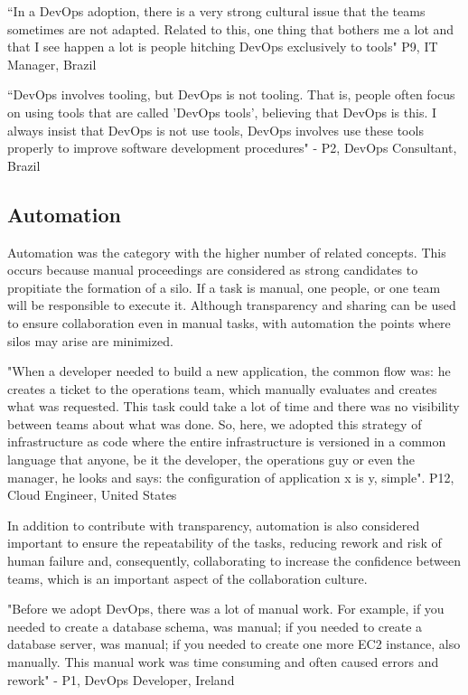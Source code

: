 ``In a DevOps adoption, there is a very strong cultural issue that the teams
sometimes are not adapted. Related to this, one thing that bothers me a lot and
that I see happen a lot is people hitching DevOps exclusively to tools" P9, IT
Manager, Brazil

``DevOps involves tooling, but DevOps is not tooling. That is, people often
focus on using tools that are called 'DevOps tools', believing that DevOps is
this. I always insist that DevOps is not use tools, DevOps involves use these
tools properly to improve software development procedures" - P2, DevOps
Consultant, Brazil

\subsection{Automation} \label{ssec:automation}
Automation was the category with the higher number of related concepts. This
occurs because manual proceedings are considered as strong candidates to
propitiate the formation of a silo. If a task is manual, one people, or one
team will be responsible to execute it. Although transparency and sharing can
be used to ensure collaboration even in manual tasks, with automation the
points where silos may arise are minimized.

"When a developer needed to build a new application, the common flow was: he
creates a ticket to the operations team, which manually evaluates and creates
what was requested. This task could take a lot of time and there was no
visibility between teams about what was done. So, here, we adopted this
strategy of infrastructure as code where the entire infrastructure is versioned
in a common language that anyone, be it the developer, the operations guy or
even the manager, he looks and says: the configuration of application x is y,
simple". P12, Cloud Engineer, United States

In addition to contribute with transparency, automation is also considered
important to ensure the repeatability of the tasks, reducing rework and risk of
human failure and, consequently, collaborating to increase the confidence
between teams, which is an important aspect of the collaboration culture.

"Before we adopt DevOps, there was a lot of manual work. For example, if you
needed to create a database schema, was manual; if you needed to create a
database server, was manual; if you needed to create one more EC2 instance,
also manually. This manual work was time consuming and often caused errors and
rework" - P1, DevOps Developer, Ireland

